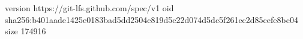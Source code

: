 version https://git-lfs.github.com/spec/v1
oid sha256:b401aade1425e0183bad5dd2504c819d5c22d074d5dc5f261ec2d85cefe8bc04
size 174916
